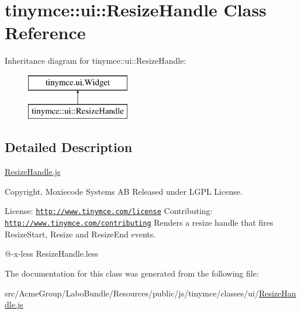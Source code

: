 \hypertarget{classtinymce_1_1ui_1_1_resize_handle}{\section{tinymce\+:\+:ui\+:\+:Resize\+Handle Class Reference}
\label{classtinymce_1_1ui_1_1_resize_handle}
}
Inheritance diagram for tinymce\+:\+:ui\+:\+:Resize\+Handle\+:\begin{figure}[H]
\begin{center}
\leavevmode
\includegraphics[height=2.000000cm]{classtinymce_1_1ui_1_1_resize_handle}
\end{center}
\end{figure}


\subsection{Detailed Description}
\hyperlink{_resize_handle_8js}{Resize\+Handle.\+js}

Copyright, Moxiecode Systems A\+B Released under L\+G\+P\+L License.

License\+: \href{http://www.tinymce.com/license}{\tt http\+://www.\+tinymce.\+com/license} Contributing\+: \href{http://www.tinymce.com/contributing}{\tt http\+://www.\+tinymce.\+com/contributing} Renders a resize handle that fires Resize\+Start, Resize and Resize\+End events.

@-\/x-\/less Resize\+Handle.\+less 

The documentation for this class was generated from the following file\+:\begin{DoxyCompactItemize}
\item 
src/\+Acme\+Group/\+Labo\+Bundle/\+Resources/public/js/tinymce/classes/ui/\hyperlink{_resize_handle_8js}{Resize\+Handle.\+js}\end{DoxyCompactItemize}
